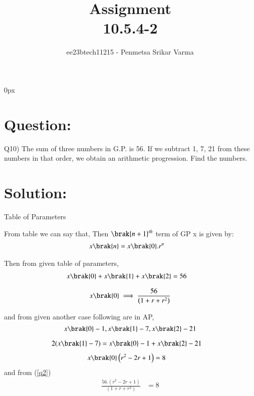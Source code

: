 \documentclass[beamer]{IEEEtran}
\theoremstyle{remark}
\begin{document}
\parindent 0px


\title{Assignment\\[1ex]10.5.4-2}
\author{ee23btech11215 - Penmetsa Srikar Varma$^{}$%
}
\maketitle
\newpage
\bigskip

\renewcommand{\thefigure}{\theenumi}
\renewcommand{\thetable}{\theenumi}
\section*{Question:}
Q10) The sum of three numbers in G.P. is 56. If we subtract 1, 7, 21 from these numbers in that order, we obtain an arithmetic progression. Find the numbers.
\section*{Solution:}
{\centering
Table of Parameters\\
}
\begin{table}[h]
    \centering
    
     \label{tab:t1}
\end{table}
From table we can say that,
Then $\brak{n+1}^{th}$ term of GP x is given by:
\begin{align}
\label{e1}
x\brak{n}&=x\brak{0}.r^{n}
\end{align}

Then from given table of parameters,
\begin{align}
x\brak{0}+x\brak{1}+x\brak{2}&=56
\end{align}

\begin{align}
\label{q2}
x\brak{0}\implies\frac{56}{\left(1+r+r^2\right)}
\end{align}

and from given another case following are in AP,
$$
x\brak{0}-1,x\brak{1}-7,x\brak{2}-21
$$

\begin{align}2(x\brak{1}-7)&=x\brak{0}-1+x\brak{2}-21\end{align}
\begin{align}x\brak{0}\left(r^2-2r+1\right)&=8\end{align}
and from (\ref{q2})
\begin{align}\frac{56.\left(r^2-2r+1\right)}{\left(1+r+r^2\right)}&=8\end{align}
\end{document}
